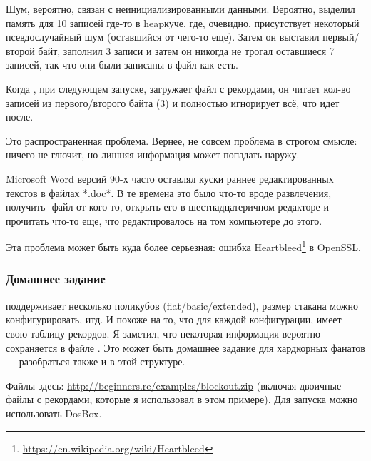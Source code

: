 Шум, вероятно, связан с неинициализированными данными.
Вероятно,  выделил память для 10 записей где-то в \gls{heap}{куче}, где, очевидно, присутствует
некоторый псевдослучайный шум (оставшийся от чего-то еще).
Затем он выставил первый/второй байт, заполнил 3 записи и затем он никогда не трогал оставшиеся 7 записей,
так что они были записаны в файл как есть.

Когда , при следующем запуске, загружает файл с рекордами, он читает кол-во записей из первого/второго байта (3)
и полностью игнорирует всё, что идет после.

Это распространенная проблема.
Вернее, не совсем проблема в строгом смысле: ничего не глючит, но лишняя информация может попадать наружу.

Microsoft Word версий 90-х часто оставлял куски раннее редактированных текстов в файлах *.doc*.
В те времена это было что-то вроде развлечения, получить -файл от кого-то, открыть его в шестнадцатеричном редакторе
и прочитать что-то еще, что редактировалось на том компьютере до этого.

Эта проблема может быть куда более серьезная: ошибка Heartbleed\footnote{\url{https://en.wikipedia.org/wiki/Heartbleed}}
в OpenSSL.

\subsubsection{Домашнее задание}

 поддерживает несколько поликубов (flat/basic/extended), размер стакана можно конфигурировать, итд.
И похоже на то, что для каждой конфигурации,  имеет свою таблицу рекордов.
Я заметил, что некоторая информация вероятно сохраняется в файле .
Это может быть домашнее задание для хардкорных фанатов  --- разобраться также и в этой структуре.

Файлы  здесь: \url{http://beginners.re/examples/blockout.zip}
(включая двоичные файлы с рекордами, которые я использовал в этом примере).
Для запуска можно использовать DosBox.

